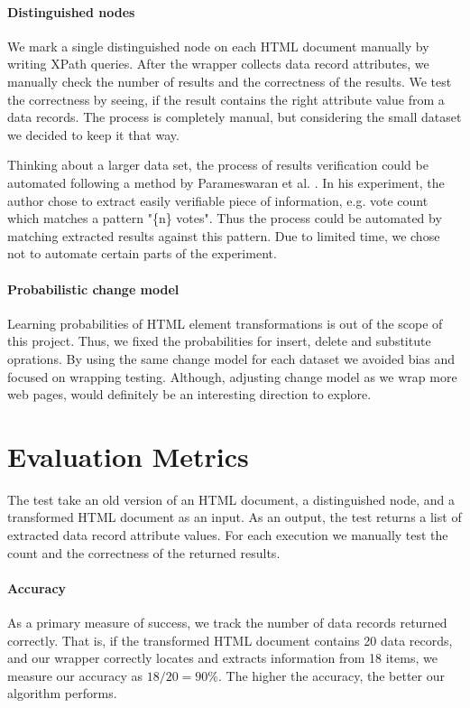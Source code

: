 \paragraph{Distinguished nodes} We mark a single distinguished node on each HTML document manually by writing XPath queries. After the wrapper collects data record attributes, we manually check the number of results and the correctness of the results. We test the correctness by seeing, if the result contains the right attribute value from a data records. The process is completely manual, but considering the small dataset we decided to keep it that way.

Thinking about a larger data set, the process of results verification could be automated following a method by Parameswaran et al. \cite{DBLP:journals/pvldb/ParameswaranDGR11}. In his experiment, the author chose to extract easily verifiable piece of information, e.g. vote count which matches a pattern "\{n\} votes". Thus the process could be automated by matching extracted results against this pattern. Due to limited time, we chose not to automate certain parts of the experiment.

\paragraph{Probabilistic change model} Learning probabilities of HTML element transformations is out of the scope of this project. Thus, we fixed the probabilities for insert, delete and substitute oprations. By using the same change model for each dataset we avoided bias and focused on wrapping testing. Although, adjusting change model as we wrap more web pages, would definitely be an interesting direction to explore.


\section{Evaluation Metrics}

The test take an old version of an HTML document, a distinguished node, and a transformed HTML document as an input. As an output, the test returns a list of extracted data record attribute values. For each execution we manually test the count and the correctness of the returned results.

\paragraph{Accuracy} As a primary measure of success, we track the number of data records returned correctly. That is, if the transformed HTML document contains 20 data records, and our wrapper correctly locates and extracts information from 18 items, we measure our accuracy as $18 / 20 = 90\%$. The higher the accuracy, the better our algorithm performs.

